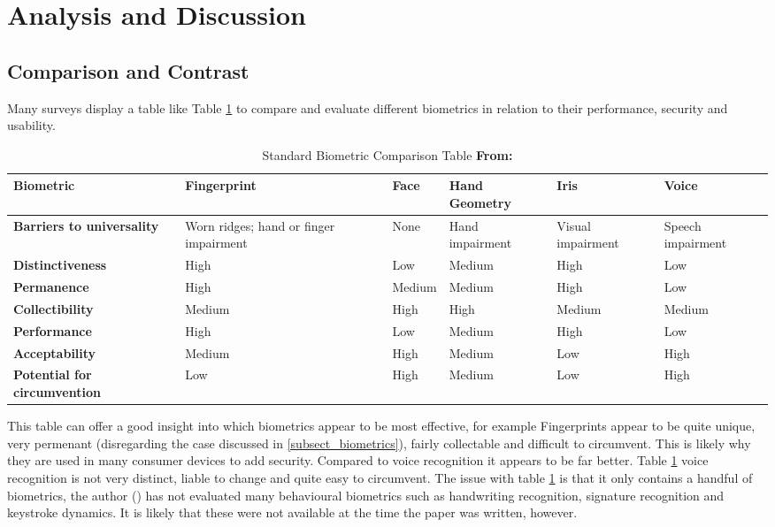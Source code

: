 \documentclass[12pt]{article}
\begin{document}
	\section{Analysis and Discussion}
	\label{sect_analysis}
	\subsection{Comparison and Contrast}
	Many surveys display a table like Table \ref{tab:common_comparison} to compare and evaluate different biometrics in relation to their performance, security and usability.

    \begin{table}[H]
        \centering
        \begin{tabular}{|p{3cm}|p{2.5cm}|p{1.5cm}|p{2cm}|p{2cm}|p{2cm}|}
            \hline
             \textbf{Biometric} & \textbf{Fingerprint} & \textbf{Face} & \textbf{Hand Geometry} & \textbf{Iris} & \textbf{Voice} \\
             \hline
             \textbf{Barriers to universality} & Worn ridges; hand or finger impairment & None & Hand impairment & Visual impairment & Speech impairment \\\hline
             \textbf{Distinctiveness} & High & Low & Medium & High & Low\\\hline
             \textbf{Permanence} & High & Medium & Medium & High & Low\\\hline
             \textbf{Collectibility} & Medium & High & High & Medium & Medium\\\hline
             \textbf{Performance} & High & Low & Medium & High & Low \\\hline
             \textbf{Acceptability} & Medium & High & Medium & Low & High \\\hline
             \textbf{Potential for circumvention} & Low & High & Medium & Low & High \\\hline
        \end{tabular}
        \caption{Standard Biometric Comparison Table \textbf{From: \cite{prabhakar2003biometric}}}
        \label{tab:common_comparison}
    \end{table}
	
	This table can offer a good insight into which biometrics appear to be most effective, for example Fingerprints appear to be quite unique, very permenant (disregarding the case discussed in \ref{subsect_biometrics}), fairly collectable and difficult to circumvent. This is likely why they are used in many consumer devices to add security. Compared to voice recognition it appears to be far better. Table \ref{tab:common_comparison} voice recognition is not very distinct, liable to change and quite easy to circumvent.
	The issue with table \ref{tab:common_comparison} is that it only contains a handful of biometrics, the author (\cite{prabhakar2003biometric}) has not evaluated many behavioural biometrics such as handwriting recognition, signature recognition and keystroke dynamics. It is likely that these were not available at the time the paper was written, however.
	
\end{document}
